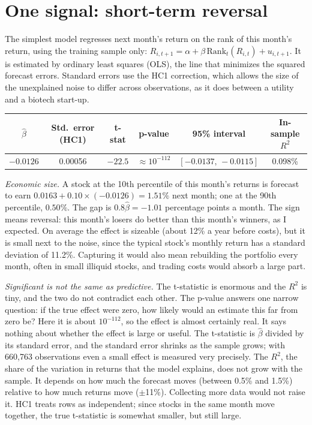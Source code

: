 \documentclass[10pt,a4paper]{article}
\begin{document}
\section{One signal: short-term reversal}

The simplest model regresses next month's return on the rank of this month's return, using the training sample only:
$R_{i,t+1}=\alpha+\beta\,\text{Rank}_t(R_{i,t})+u_{i,t+1}$. It is estimated by ordinary least squares (OLS), the line
that minimizes the squared forecast errors. Standard errors use the HC1 correction, which allows the size of the
unexplained noise to differ across observations, as it does between a utility and a biotech start-up.

\begin{center}\small
\begin{tabular}{cccccc}
\toprule
$\hat\beta$ & Std.\ error (HC1) & t-stat & p-value & 95\% interval & In-sample $R^2$ \\
\midrule
$-0.0126$ & 0.00056 & $-22.5$ & $\approx 10^{-112}$ & $[-0.0137,\,-0.0115]$ & 0.098\% \\
\bottomrule
\end{tabular}
\end{center}

\textit{Economic size.} A stock at the 10th percentile of this month's returns is forecast to earn
$0.0163+0.10\times(-0.0126)=1.51\%$ next month; one at the 90th percentile, $0.50\%$. The gap is
$0.8\hat\beta=-1.01$ percentage points a month. The sign means reversal: this month's losers do better than this
month's winners, as I expected. On average the effect is sizeable (about 12\% a year before costs), but it is small
next to the noise, since the typical stock's monthly return has a standard deviation of 11.2\%. Capturing it would
also mean rebuilding the portfolio every month, often in small illiquid stocks, and trading costs would absorb a
large part.

\textit{Significant is not the same as predictive.} The t-statistic is enormous and the $R^2$ is tiny, and the two do
not contradict each other. The p-value answers one narrow question: if the true effect were zero, how likely would
an estimate this far from zero be? Here it is about $10^{-112}$, so the effect is almost certainly real. It
says nothing about whether the effect is large or useful. The t-statistic is $\hat\beta$ divided by its standard
error, and the standard error shrinks as the sample grows; with 660,763 observations even a small effect is measured
very precisely. The $R^2$, the share of the variation in returns that the model explains, does not grow with the
sample. It depends on how much the forecast moves (between 0.5\% and 1.5\%) relative to how much returns move
($\pm$11\%). Collecting more data would not raise it. HC1 treats rows as independent; since stocks in the same month move together, the true t-statistic is somewhat
smaller, but still large.
\end{document}
